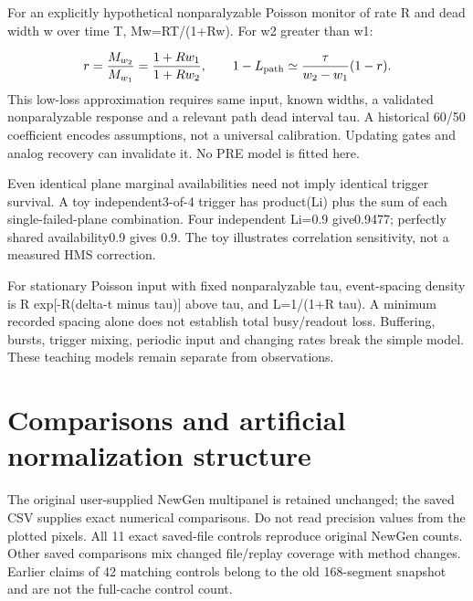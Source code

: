 For an explicitly hypothetical nonparalyzable Poisson monitor of rate R and dead width w over time T, Mw=RT/(1+Rw). For w2 greater than w1:


\[
r=\frac{M_{w_2}}{M_{w_1}}=\frac{1+Rw_1}{1+Rw_2},\qquad
1-L_{\rm path}\simeq \frac{\tau}{w_2-w_1}(1-r).
\]
This low-loss approximation requires same input, known widths, a validated nonparalyzable response and a relevant path dead interval tau. A historical 60/50 coefficient encodes assumptions, not a universal calibration. Updating gates and analog recovery can invalidate it. No PRE model is fitted here.


Even identical plane marginal availabilities need not imply identical trigger survival. A toy independent3-of-4 trigger has product(Li) plus the sum of each single-failed-plane combination. Four independent Li=0.9 give0.9477; perfectly shared availability0.9 gives 0.9. The toy illustrates correlation sensitivity, not a measured HMS correction.


For stationary Poisson input with fixed nonparalyzable tau, event-spacing density is R exp[-R(delta-t minus tau)] above tau, and L=1/(1+R tau). A minimum recorded spacing alone does not establish total busy/readout loss. Buffering, bursts, trigger mixing, periodic input and changing rates break the simple model. These teaching models remain separate from observations.


\section{Comparisons and artificial normalization structure}
The original user-supplied NewGen multipanel is retained unchanged; the saved CSV supplies exact numerical comparisons. Do not read precision values from the plotted pixels. All 11 exact saved-file controls reproduce original NewGen counts. Other saved comparisons mix changed file/replay coverage with method changes. Earlier claims of 42 matching controls belong to the old 168-segment snapshot and are not the full-cache control count.


